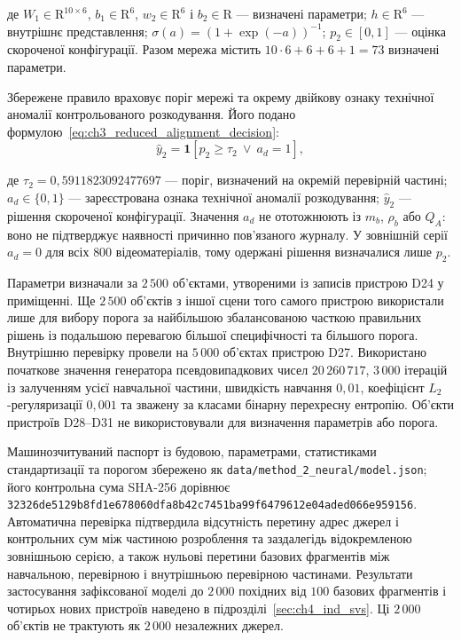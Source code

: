 де $W_1\in\mathrm R^{10\times6}$, $b_1\in\mathrm R^6$, $w_2\in\mathrm R^6$ і $b_2\in\mathrm R$ --- визначені параметри; $h\in\mathrm R^6$ --- внутрішнє представлення; $\sigma(a)=(1+\exp(-a))^{-1}$; $p_2\in[0,1]$ --- оцінка скороченої конфігурації. Разом мережа містить $10\cdot6+6+6+1=73$ визначені параметри.

Збережене правило враховує поріг мережі та окрему двійкову ознаку технічної аномалії контрольованого розкодування. Його подано формулою~\eqref{eq:ch3_reduced_alignment_decision}:
\begin{equation}
\widehat y_2=\mathbf 1\!\left[p_2\geq\tau_2\ \lor\ a_d=1\right],
\label{eq:ch3_reduced_alignment_decision}
\end{equation}

де $\tau_2=0{,}5911823092477697$ --- поріг, визначений на окремій перевірній частині; $a_d\in\{0,1\}$ --- зареєстрована ознака технічної аномалії розкодування; $\widehat y_2$ --- рішення скороченої конфігурації. Значення $a_d$ не ототожнюють із $m_b$, $\rho_b$ або $Q_A$: воно не підтверджує наявності причинно пов’язаного журналу. У зовнішній серії $a_d=0$ для всіх $800$ відеоматеріалів, тому одержані рішення визначалися лише $p_2$.

Параметри визначали за $2\,500$ об’єктами, утвореними із записів пристрою D24 у приміщенні. Ще $2\,500$ об’єктів з іншої сцени того самого пристрою використали лише для вибору порога за найбільшою збалансованою часткою правильних рішень із подальшою перевагою більшої специфічності та більшого порога. Внутрішню перевірку провели на $5\,000$ об’єктах пристрою D27. Використано початкове значення генератора псевдовипадкових чисел $20\,260\,717$, $3\,000$ ітерацій із залученням усієї навчальної частини, швидкість навчання $0{,}01$, коефіцієнт $L_2$-регуляризації $0{,}001$ та зважену за класами бінарну перехресну ентропію. Об’єкти пристроїв D28--D31 не використовували для визначення параметрів або порога.

Машинозчитуваний паспорт із будовою, параметрами, статистиками стандартизації та порогом збережено як \nolinkurl{data/method_2_neural/model.json}; його контрольна сума SHA-256 дорівнює \nolinkurl{32326de5129b8fd1e678060dfa8b42c7451ba99f6479612e04aded066e959156}. Автоматична перевірка підтвердила відсутність перетину адрес джерел і контрольних сум між частиною розроблення та заздалегідь відокремленою зовнішньою серією, а також нульові перетини базових фрагментів між навчальною, перевірною і внутрішньою перевірною частинами. Результати застосування зафіксованої моделі до $2\,000$ похідних від $100$ базових фрагментів і чотирьох нових пристроїв наведено в підрозділі~\ref{sec:ch4_ind_svs}. Ці $2\,000$ об’єктів не трактують як $2\,000$ незалежних джерел.

